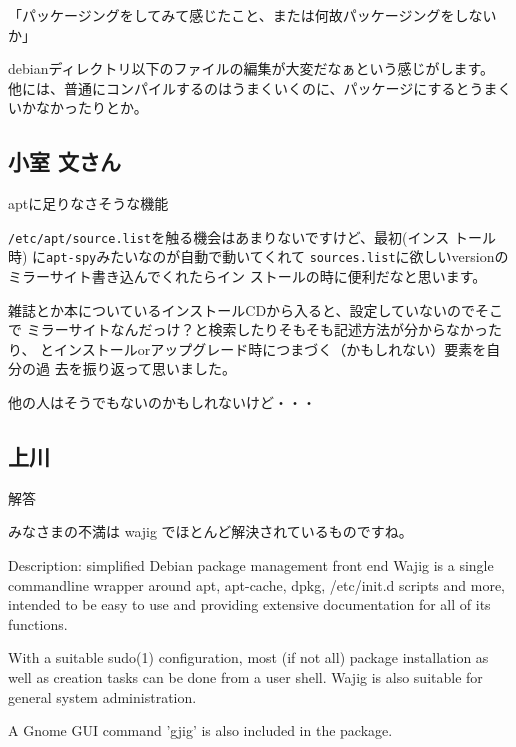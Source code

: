 \documentclass[cjk,dvipdfmx]{beamer}
\begin{document}
\begin{frame}
 {「パッケージングをしてみて感じたこと、または何故パッケージングをしないか」}

 debianディレクトリ以下のファイルの編集が大変だなぁという感じがします。
 他には、普通にコンパイルするのはうまくいくのに、パッケージにするとうまくいかなかったりとか。
\end{frame}

\subsection{小室 文さん}

\begin{frame}
 {aptに足りなさそうな機能}

 \texttt{/etc/apt/source.list}を触る機会はあまりないですけど、最初(インス
 トール時) に\texttt{apt-spy}みたいなのが自動で動いてくれて
 \texttt{sources.list}に欲しいversionのミラーサイト書き込んでくれたらイン
 ストールの時に便利だなと思います。

 雑誌とか本についているインストールCDから入ると、設定していないのでそこで
 ミラーサイトなんだっけ？と検索したりそもそも記述方法が分からなかったり、
 とインストールorアップグレード時につまづく（かもしれない）要素を自分の過
 去を振り返って思いました。

 他の人はそうでもないのかもしれないけど・・・
\end{frame}


\subsection*{上川}
\begin{frame}[containsverbatim]{解答}

みなさまの不満は wajig でほとんど解決されているものですね。

\begin{texttt}
 Description: simplified Debian package management front end
 Wajig is a single commandline wrapper around apt, apt-cache, dpkg,
 /etc/init.d scripts and more, intended to be easy to use and providing
 extensive documentation for all of its functions.

 With a suitable sudo(1) configuration, most (if not all) package installation
 as well as creation tasks can be done from a user shell. Wajig is also
 suitable for general system administration.

 A Gnome GUI command 'gjig' is also included in the package.
\end{texttt}


\end{frame}
\end{document}
